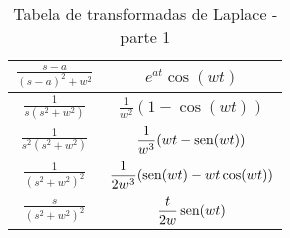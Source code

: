 \begin{table}
\begin{small}
\begin{center}
{\begin{tabular}{|c|c|}
\hline 
 $\displaystyle \frac{s-a}{(s-a)^2+w^2} $&$\displaystyle  e^{at}\cos(wt)$ \\[1ex] 
\hline
 $\displaystyle \frac{1}{s(s^2+w^2)} $&$\displaystyle  \frac{1}{w^2}(1-\cos(wt))$ \\[1ex] 
\hline
 $\displaystyle \frac{1}{s^2(s^2+w^2)} $&$\displaystyle  \frac{1}{w^3}(wt-\operatorname{sen}(wt))$ \\[1ex] 
\hline
 $\displaystyle \frac{1}{(s^2+w^2)^2} $&$\displaystyle  \frac{1}{2w^3}(\operatorname{sen}(wt)-wt\cos(wt))$ \\[1ex] 
\hline
 $\displaystyle \frac{s}{(s^2+w^2)^2} $&$\displaystyle  \frac{t}{2w}\operatorname{sen}(wt)$ \\[1ex] 
\hline
\end{tabular}}
\caption{\label{tab_trans_Lap_1}Tabela de transformadas de Laplace - parte 1}
\end{center}
\end{small}
\end{table}	

